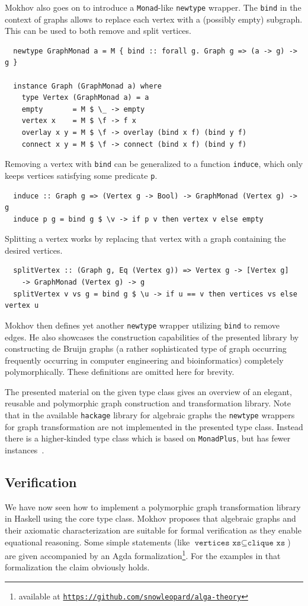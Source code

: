 \documentclass{article}
\newcommand{\hs}{\texttt}
\begin{document}
Mokhov also goes on to introduce a \hs{Monad}-like \hs{newtype} wrapper. The
\hs{bind} in the context of graphs allows to replace each vertex with a
(possibly empty) subgraph. This can be used to both remove and split vertices.
\begin{verbatim}
  newtype GraphMonad a = M { bind :: forall g. Graph g => (a -> g) -> g }

  instance Graph (GraphMonad a) where
    type Vertex (GraphMonad a) = a
    empty       = M $ \_ -> empty
    vertex x    = M $ \f -> f x
    overlay x y = M $ \f -> overlay (bind x f) (bind y f)
    connect x y = M $ \f -> connect (bind x f) (bind y f)
\end{verbatim}
Removing a vertex with \hs{bind} can be generalized to a function \hs{induce},
which only keeps vertices satisfying some predicate \hs{p}.
\begin{verbatim}
  induce :: Graph g => (Vertex g -> Bool) -> GraphMonad (Vertex g) -> g
  induce p g = bind g $ \v -> if p v then vertex v else empty
\end{verbatim}
Splitting a vertex works by replacing that vertex with a graph containing the
desired vertices.
\begin{verbatim}
  splitVertex :: (Graph g, Eq (Vertex g)) => Vertex g -> [Vertex g] 
    -> GraphMonad (Vertex g) -> g
  splitVertex v vs g = bind g $ \u -> if u == v then vertices vs else vertex u
\end{verbatim}
Mokhov then defines yet another \hs{newtype} wrapper utilizing \hs{bind} to
remove edges. He also showcases the construction capabilities of the presented
library by constructing de Bruijn graphs (a rather sophisticated type of graph
occurring frequently occurring in computer engineering and bioinformatics)
completely polymorphically. These definitions are omitted here for brevity.

The presented material on the given type class gives an overview of an elegant,
reusable and polymorphic graph construction and transformation library. Note
that in the available \texttt{hackage} library for algebraic graphs the
\hs{newtype} wrappers for graph transformation are not implemented in the
presented type class. Instead there is a higher-kinded type class which is based
on \hs{MonadPlus}, but has fewer instances~\cite{mokhov2017algebraic}.

\subsection{Verification}\label{sec:verification}
We have now seen how to implement a polymorphic graph transformation library in
Haskell using the core type class. Mokhov proposes that algebraic graphs and
their axiomatic characterization are suitable for formal verification as they
enable equational reasoning. Some
simple statements (like $\hs{vertices xs} \subseteq \hs{clique xs}$) are given
accompanied by an Agda formalization\footnote{available at
  \texttt{\href{https://github.com/snowleopard/alga-theory}{https://github.com/snowleopard/alga-theory}}}.
For the examples in that formalization the claim obviously holds.
\end{document}
